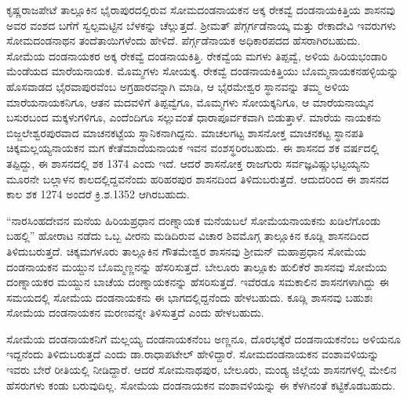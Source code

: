 \vskip 2pt

ಕೃಷ್ಣರಾಜಪೇಟೆ ತಾಲ್ಲೂಕಿನ ಭೈರಾಪುರದಲ್ಲಿರುವ ಸೋಮದಂಡನಾಯಕನ ಅಕ್ಕ ರೇಕವ್ವೆ ದಂಡನಾಯಕಿತ್ತಿಯ ಶಾಸನವು ಅವರ ವಂಶದ ಬಗೆಗೆ ಸ್ವಲ್ಪಮಟ್ಟಿನ ಬೆಳಕನ್ನು ಚೆಲ್ಲುತ್ತದೆ. ಶ‍್ರೀಮತ್​ ಪೆಗ್ಗರ್ಗಡೆನಾಯ್ಕ ಮತ್ತು ರೇಕಾದೇವಿ ಇವರುಗಳು ಸೋಮದಂಡನಾಥನ ತಂದೆತಾಯಿಗಳೆಂದು ಹೇಳಿದೆ. ಪೆರ್ಗ್ಗಡೆನಾಯಕ ಅಧಿಕಾರಪದದ ಹೆಸರಾಗಿರಬಹುದು. ಸೋಮೆಯ ದಂಡನಾಯಕರ ಅಕ್ಕ ರೇಕವ್ವೆ ದಂಡನಾಯಕಿತ್ತಿ. ರೇಕವ್ವೆಯ ಮಗಳು ತಿಪ್ಪವ್ವೆ, ಅಳಿಯ ಹಿರಿಯಭಂಡಾರಿ ಮೆಂಡೆಯದ ಮಾರೆಯನಾಯಕ. ಮೊಮ್ಮಗಳು ಸೋಯಕ್ಕ. ರೇಕವ್ವೆ ದಂಡನಾಯಕಿತ್ತಿಯು ಬೊಮ್ಮನಾಯಕನಹಳ್ಳಿಯನ್ನು ಹೊಸವಾಡದ ಭೈರವಾಪುರವೆಂಬ ಅಗ್ರಹಾರವನ್ನಾಗಿ ಮಾಡಿ, ಆ ಭೈರಮೇಶ್ವರ ಸ್ಥಾನವನ್ನು ತಮ್ಮ ಅಳಿಯ ಮಾರೆಯನಾಯಕ\-ನಿಗೂ, ಆತನ ಮದವಳಿಗೆ ತಿಪ್ಪವ್ವೆಗೂ, ಮೊಮ್ಮಗಳು ಸೋಯಕ್ಕನಿಗೂ, ಆ ಮಾರೆಯನಾಯ್ಕನ ಬಸುರಬಂದ ಮಕ್ಕಳುಗಳಿಗೂ, ಎಂದೆಂದಿಗೂ ಸಲ್ಲುವಂತೆ ಧಾರಾಪೂರ್ವಕವಾಗಿ ಬಿಡುತ್ತಾಳೆ. ಮಾರೆಯ ನಾಯಕನು ಬಿಜ್ಜಲೇಶ್ವರಪುರವಾದ ಮಾಚನಕಟ್ಟೆಯ ಸ್ಥಾನಿಕನಾಗಿದ್ದನು. ಮಾಚಲಗಟ್ಟ ಶಾಸನೋಕ್ತ ಮಾಚನಕಟ್ಟ ಸ್ಥಾನಪತಿ ಚಿಕ್ಕಮಲ್ಲಯ್ಯನಾಯಕನ ಮಗ ಕೇತೆಮಾದೆಯನಾಯಕ ಇವನ ವಂಶಸ್ಥರಿರಬಹುದು. ಈ ಶಾಸನದ ಶಕ ವರ್ಷದಲ್ಲಿ ತಪ್ಪಿದ್ದು, ಈ ಶಾಸನದಲ್ಲಿ ಶಕ 1374 ಎಂದು ಇದೆ. ಆದರೆ ಶಾಸನೋಕ್ತ ರಾಜಗುರು ಸರ್ವಜ್ಞವಿಷ್ಣುಭಟ್ಟಯ್ಯನು ಮೂರನೇ ಬಲ್ಲಾಳನ ಕಾಲದಲ್ಲಿದ್ದವನೆಂದು ಹರಿಹರಪುರ ಶಾಸನದಿಂದ ತಿಳಿದುಬರುತ್ತದೆ. ಆದುದರಿಂದ ಈ ಶಾಸನದ ಕಾಲ ಶಕ 1274 ಅಂದರೆ ಕ್ರಿ.ಶ.1352 ಆಗಿರಬಹುದು.

\vskip 2pt

“ನಾರಸಿಂಹದೇವನ ಮನೆಯ ಹಿರಿಯಪ್ರಧಾನ ದಂಣ್ನಾಯಕ ಮನೆಯಬಲೆ ಸೋಮೆಯನಾಯಕನು ಖಡಿಲೆಗೊಂಡು ಬಹಲ್ಲಿ” ಹೋರಾಟ ನಡೆದು ಒಬ್ಬ ವೀರನು ಮಡಿದಿರುವ ವಿಚಾರ ಶಿವಮೊಗ್ಗ ತಾಲ್ಲೂಕಿನ ಕೂಡ್ಲಿ ಶಾಸನದಿಂದ ತಿಳಿದುಬರುತ್ತದೆ. ಚಿಕ್ಕಮಗಳೂರು ತಾಲ್ಲೂಕಿನ ಗೌತಮೇಶ್ವರ ಶಾಸನವು ಶ‍್ರೀಮನ್​ ಮಹಾಪ್ರಧಾನ ಸೋಮೆಯ ದಂಡನಾಯಕನ ಮಯ್ದುನ ಬೊಮ್ಮಣ್ಣನನ್ನು ಹೆಸರಿಸುತ್ತದೆ. ಬೇಲೂರು ತಾಲ್ಲೂಕು ಹುಲಿಕೆರೆ ಶಾಸನವು ಸೋಮೆಯ ದಂಣ್ನಾಯಕರ ಮಯ್ದುನ ಬಾಚೆಯ ದಂಣ್ನಾಯಕನನ್ನು ಹೆಸರಿಸುತ್ತದೆ. ಇವೆರಡೂ ಸಮಕಾಲಿನ ಶಾಸನಗಳಾಗಿದ್ದು ಈ ಸಮಯದಲ್ಲಿ ಸೋಮೆಯ ದಂಡನಾಯಕನು ಈ ಭಾಗದಲ್ಲಿದ್ದನೆಂದು ಹೇಳಬಹುದು. ಕೂಡ್ಲಿ ಶಾಸನವು ಬಹುಶಃ ಸೋಮೆಯ ದಂಡನಾಯಕನ ಮರಣವನ್ನೇ ತಿಳಿಸುತ್ತದೆ ಎಂದು ಹೇಳಬಹುದು.

\vskip 2pt

ಸೋಮೆಯ ದಂಡನಾಯಕನಿಗೆ ಮಲ್ಲಯ್ಯ ದಂಡನಾಯಕನೆಂಬ ಅಣ್ಣನೂ, ದೊರಭಕ್ಕೆರೆ ದಂಡನಾಯಕನೆಂಬ ಅಳಿಯನೂ ಇದ್ದನೆಂದು ತಿಳಿದುಬರುತ್ತದೆ ಎಂದು ಡಾ.ರಾಧಾಪಟೇಲ್​ ಹೇಳಿದ್ದಾರೆ. ಸೋಮದಂಡನಾಯಕನ ವಂಶಾವಳಿಯನ್ನು ಇವರು ಬೇರೆ ರೀತಿಯಲ್ಲಿ ನೀಡಿದ್ದಾರೆ. ಆದರೆ ಸೋಮನಾಥಪುರ, ಬೇಲೂರು, ಮಂಡ್ಯ ಜಿಲ್ಲೆಯ ಶಾಸನಗಳಲ್ಲಿ ಮೇಲಿನ ಹೆಸರುಗಳು ಕಂಡು ಬರುವುದಿಲ್ಲ. ಸೋಮೆಯ ದಂಡನಾಯಕನ ವಂಶಾವಳಿಯನ್ನು ಈ ಕೆಳಗಿನಂತೆ ಕಟ್ಟಿಕೊಡಬಹುದು.

